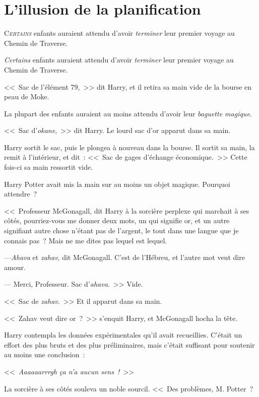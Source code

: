 \chapter{L'illusion de la planification}

\lettrine{C}{\emph{ertains}} enfants auraient attendu d'avoir \emph{terminer} leur premier voyage au Chemin de Traverse.

\emph{Certains} enfants auraient attendu d'avoir \emph{terminer} leur premier voyage au Chemin de Traverse.

<<~Sac de l'élément 79,~>> dit Harry, et il retira sa main vide de la bourse en peau de Moke.

La plupart des enfants auraient au moins attendu d'avoir leur \emph{baguette magique}.

<<~Sac d'\emph{okane},~>> dit Harry. Le lourd sac d'or apparut dans sa main.

Harry sortit le sac, puis le plongea à nouveau dans la bourse. Il sortit sa main, la remit à l'intérieur, et dit~: <<~Sac de gages d'échange économique.~>> Cette fois-ci sa main ressortit vide.

Harry Potter avait mis la main sur au moins un objet magique. Pourquoi attendre~?

<<~Professeur McGonagall, dit Harry à la sorcière perplexe qui marchait à ses côtés, pourriez-vous me donner deux mots, un qui signifie or, et un autre signifiant autre chose n'étant pas de l'argent, le tout dans une langue que je connais pas~? Mais ne me dites pas lequel est lequel.

---\emph{Ahava} et \emph{zahav}, dit McGonagall. C'est de l'Hébreu, et l'autre mot veut dire amour.

--- Merci, Professeur. Sac d'\emph{ahava}.~>> Vide.

<<~Sac de \emph{zahav}.~>> Et il apparut dans sa main.

<<~Zahav veut dire or~?~>> s'enquit Harry, et McGonagall hocha la tête.

Harry contempla les données expérimentales qu'il avait recueillies. C'était un effort des plus bruts et des plus préliminaires, mais c'était suffisant pour soutenir au moins une conclusion~:

<<~\emph{Aaaaaarrrgh ça n'a aucun sens~!}~>>

La sorcière à ses côtés souleva un noble sourcil. <<~Des problèmes, M. Potter~?

